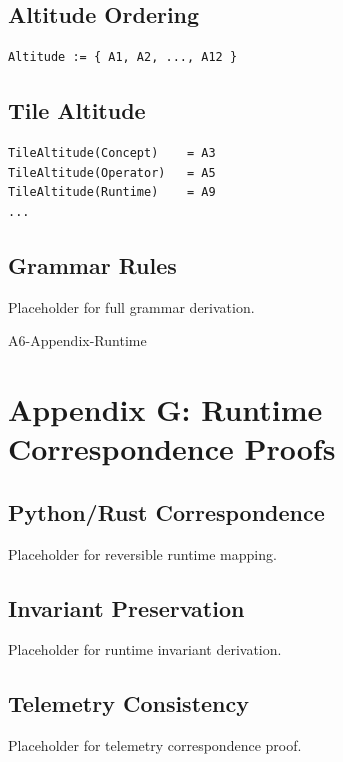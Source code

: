 \documentclass[11pt]{article}
\begin{document}
\subsection{Altitude Ordering}
\begin{verbatim}
Altitude := { A1, A2, ..., A12 }
\end{verbatim}

\subsection{Tile Altitude}
\begin{verbatim}
TileAltitude(Concept)    = A3
TileAltitude(Operator)   = A5
TileAltitude(Runtime)    = A9
...
\end{verbatim}

\subsection{Grammar Rules}
Placeholder for full grammar derivation.

\newpage


\begin{citationmembrane}{A6-Appendix-Runtime}
\end{citationmembrane}

\section{Appendix G: Runtime Correspondence Proofs}

\subsection{Python/Rust Correspondence}
Placeholder for reversible runtime mapping.

\subsection{Invariant Preservation}
Placeholder for runtime invariant derivation.

\subsection{Telemetry Consistency}
Placeholder for telemetry correspondence proof.
\end{document}
